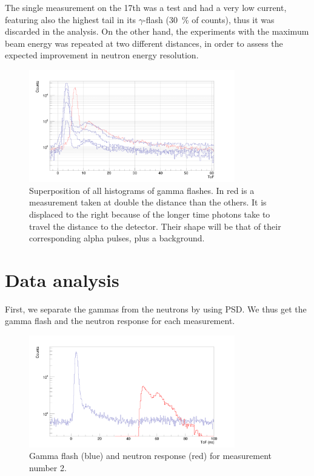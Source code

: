 \documentclass[a4paper,12pt]{report}
\begin{document}
The single measurement on the 17th was a test and had a very low current, featuring also the highest tail in its $\gamma$-flash (\qty{30}{\percent} of counts), thus it was discarded in the analysis.
On the other hand, the experiments with the maximum beam energy was repeated at two different distances, in order to assess the expected improvement in neutron energy resolution.

\begin{figure}[H]
	\centering
	\includegraphics[width=0.80\textwidth]{uneven_gflash.png}
	\caption{Superposition of all histograms of gamma flashes.
	In red is a measurement taken at double the distance than the others.
	It is displaced to the right because of the longer time photons take to travel the distance to the detector.
	Their shape will be that of their corresponding alpha pulses, plus a background.}
	\label{uneven_gflash}
\end{figure}

\section{Data analysis}
First, we separate the gammas from the neutrons by using PSD.
We thus get the gamma flash and the neutron response for each measurement.

\begin{figure}[H]
	\centering
	\includegraphics[width=0.80\textwidth]{separated_tof.png}
	\caption{Gamma flash (blue) and neutron response (red) for measurement number 2.}
	\label{separated_tof}
\end{figure}
\end{document}
